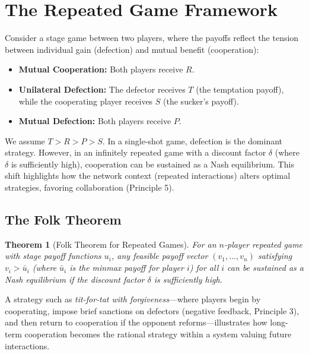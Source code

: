 \documentclass[12pt,openany]{book}
\newtheorem{theorem}{Theorem}[chapter] %
\begin{document}
\section{The Repeated Game Framework}
Consider a stage game between two players, where the payoffs reflect the tension between individual gain (defection) and mutual benefit (cooperation):
\begin{itemize}
    \item \textbf{Mutual Cooperation:} Both players receive \( R \).
    \item \textbf{Unilateral Defection:} The defector receives \( T \) (the temptation payoff), while the cooperating player receives \( S \) (the sucker's payoff).
    \item \textbf{Mutual Defection:} Both players receive \( P \).
\end{itemize}
We assume \( T > R > P > S \). In a single-shot game, defection is the dominant strategy. However, in an infinitely repeated game with a discount factor \( \delta \) (where \( \delta \) is sufficiently high), cooperation can be sustained as a Nash equilibrium. This shift highlights how the network context (repeated interactions) alters optimal strategies, favoring collaboration (Principle 5). %

\subsection{The Folk Theorem}
\begin{theorem}[Folk Theorem for Repeated Games]
For an \( n \)-player repeated game with stage payoff functions \( u_i \), any feasible payoff vector \( (v_1, \dots, v_n) \) satisfying \( v_i > \bar{u}_i \) (where \(\bar{u}_i\) is the minmax payoff for player \( i \)) for all \( i \) can be sustained as a Nash equilibrium if the discount factor \( \delta \) is sufficiently high.
\end{theorem}
A strategy such as \emph{tit-for-tat with forgiveness}---where players begin by cooperating, impose brief sanctions on defectors (negative feedback, Principle 3), and then return to cooperation if the opponent reforms---illustrates how long-term cooperation becomes the rational strategy within a system valuing future interactions.
\end{document}
